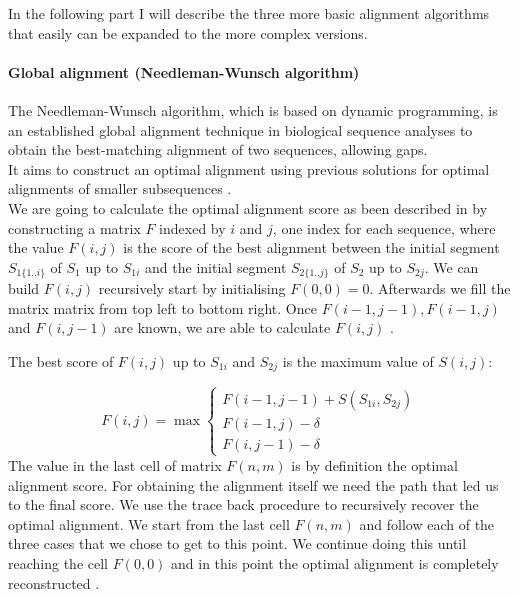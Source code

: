 \documentclass[11pt,a4paper]{report}
\begin{document}
In the following part I will describe the three more basic alignment 
algorithms that easily can be expanded to the more complex versions.






\paragraph{ Global alignment (Needleman-Wunsch algorithm) }


The Needleman-Wunsch algorithm, which is based on dynamic programming, 
is an established global alignment technique in biological 
sequence analyses to obtain the best-matching alignment of two sequences, 
allowing  gaps.\\
It aims to construct an optimal alignment using previous solutions for
optimal alignments of smaller subsequences \cite{durbin}.\\
We are going to calculate the optimal alignment score as been described 
in\cite{durbin} by constructing a matrix $F$ indexed
by $i$ and $j$, one index for each sequence, where the value $F(i, j)$ is the score
of the best alignment between the initial segment $S_{1\{1..i\}}$ of $S_{1}$ 
up to $S_{1i}$ and the initial segment $S_{2\{1..j\}}$ of $S_{2}$  up to 
$S_{2j}$. We can build $F(i, j)$ recursively start by initialising 
$F(0, 0) = 0$. Afterwards we fill the matrix matrix from top left to 
bottom right. 
Once $ F(i-1, j-1 ), F(i-1 , j) $ and $ F(i , j-1) $ are known, we 
are able to calculate $ F(i, j)$ \cite{durbin}.

The best score of $F(i,j)$ up to $S_{1i}$ and $S_{2j}$ is the maximum 
value of $S(i,j)$:

\[ F(i,j)= \max
\begin{cases}
   F(i-1,j-1) + S(S_{1i} , S_{2j})\\
   F(i-1 , j)- \delta\\
   F(i,j-1)- \delta
\end{cases}
\]
The value in the last cell of matrix $F(n,m)$ is by definition the optimal 
alignment score. 
For obtaining the alignment itself we need the path that led us to the 
final score. We use the trace back procedure to recursively recover the 
optimal alignment\cite{durbin}\cite{eddydynamic}.
We start from the last cell $F(n,m)$ and follow each of the three cases 
that we chose to get to this point. We continue doing this until reaching
the cell $F(0,0)$ and in this point the optimal alignment is completely 
reconstructed \cite{eddydynamic}.
\end{document}
